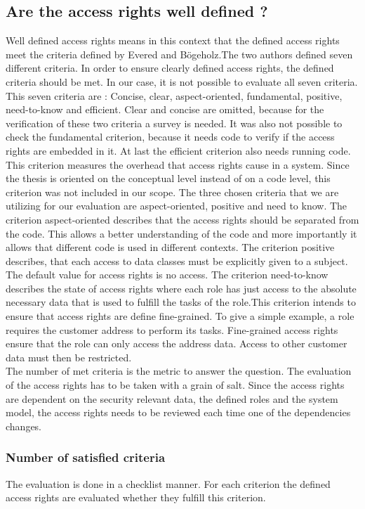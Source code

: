 \subsection{Are the access rights well defined ?}
Well defined access rights means in this context that the defined access rights meet the criteria defined by Evered and Bögeholz\cite{CaseStudyAndAccessrigths}.The two authors defined seven different criteria. In order to ensure clearly defined access rights, the defined criteria should be met. In our case, it is not possible to evaluate all seven criteria. This seven criteria are : Concise, clear, aspect-oriented, fundamental, positive, need-to-know and efficient. Clear and concise are omitted, because for the verification of these two criteria a survey is needed. It was also not possible to check the fundamental criterion, because it needs code to verify if the access rights are embedded in it. At last the efficient criterion also needs running code. This criterion measures the overhead that access rights cause in a system. Since the thesis is oriented on the conceptual level instead of on a code level, this criterion was not included in our scope. 
The three chosen criteria that we are utilizing for our evaluation are aspect-oriented, positive and need to know. The criterion aspect-oriented describes that the access rights should be separated from the code. This allows a better understanding of the code and more importantly it allows that different code is used in different contexts. The criterion positive describes, that each access to data classes must be explicitly given to a subject. The default value for access rights is no access. The criterion need-to-know describes the state of access rights where each role has just access to the absolute necessary data that is used to fulfill the tasks of the role.This criterion intends to ensure that access rights are define fine-grained. To give a simple example, a role requires the customer address to perform its tasks.  Fine-grained access rights ensure that the role can only access the address data. Access to other customer data must then be restricted.\\ The number of met criteria is the metric to answer the question. The evaluation of the access rights has to be taken with a grain of salt. Since the access rights are dependent on the security relevant data, the defined roles and the system model, the access rights needs to be reviewed each time one of the dependencies changes.
\subsubsection{Number of satisfied criteria}
The evaluation is done in a checklist manner. For each criterion the defined access rights are evaluated whether they fulfill this criterion. 
